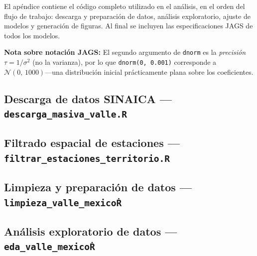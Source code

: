 ﻿\documentclass[12pt]{article}
\begin{document}
El ap\'endice contiene el c\'odigo completo utilizado en el an\'alisis,
en el orden del flujo de trabajo: descarga y preparaci\'on de datos,
an\'alisis exploratorio, ajuste de modelos y generaci\'on de figuras.
Al final se incluyen las especificaciones JAGS de todos los modelos.

\noindent\textbf{Nota sobre notaci\'on JAGS:} El segundo argumento de
\texttt{dnorm} es la \emph{precisi\'on} $\tau = 1/\sigma^2$
(no la varianza), por lo que \texttt{dnorm(0, 0.001)} corresponde a
$\mathcal{N}(0,\,1000)$---una distribuci\'on inicial pr\'acticamente
plana sobre los coeficientes.

\subsection*{Descarga de datos SINAICA ---
             \texttt{descarga\_masiva\_valle.R}}


\subsection*{Filtrado espacial de estaciones ---
             \texttt{filtrar\_estaciones\_territorio.R}}


\subsection*{Limpieza y preparaci\'on de datos ---
             \texttt{limpieza\_valle\_mexico\.R}}


\subsection*{An\'alisis exploratorio de datos ---
             \texttt{eda\_valle\_mexico\.R}}

\end{document}
